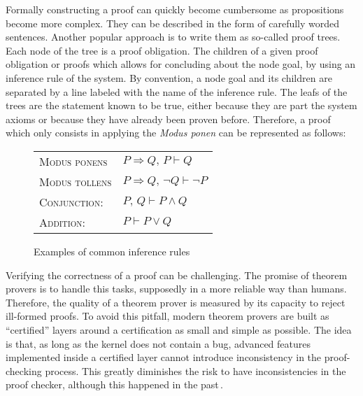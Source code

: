 \documentclass[oneside,a4paper]{memoir}
\theoremstyle{break}
\begin{document}
Formally constructing a proof can quickly become cumbersome as propositions
become more complex.
%
They can be described in the form of carefully worded sentences.
%
Another popular approach is to write them as so-called proof trees.
%
Each node of the tree is a proof obligation.
%
The children of a given proof obligation or proofs which allows for concluding
about the node goal, by using an inference rule of the system.
%
By convention, a node goal and its children are separated by a line labeled with
the name of the inference rule.
%
The leafs of the trees are the statement known to be true, either because they
are part the system axioms or because they have already been proven before.
%
Therefore, a proof which only consists in applying the \emph{Modus ponen} can be
represented as follows:
%
\begin{prooftree}
     
\end{prooftree}

\begin{figure}
  \begin{center}
    \begin{tabular}{ll}
      {\scshape Modus ponens} & \( P \Rightarrow Q\text{, }P \vdash Q \) \\
      {\scshape Modus tollens} &
                                 \( P \Rightarrow Q\text{, }\neg Q \vdash \neg P \) \\
      {\scshape Conjunction:} & \( P\text{, }Q \vdash P \wedge Q \) \\
      {\scshape Addition:} & \( P \vdash P \vee Q \)
    \end{tabular}
  \end{center}

  \caption{Examples of common inference rules}
  \label{fig:sota:inference}
\end{figure}

Verifying the correctness of a proof can be challenging.
%
The promise of theorem provers is to handle this tasks, supposedly in a more
reliable way than humans.
%
Therefore, the quality of a theorem prover is measured by its capacity to reject
ill-formed proofs.
%
To avoid this pitfall, modern theorem provers are built as ``certified'' layers
around a certification as small and simple as possible.
%
The idea is that, as long as the kernel does not contain a bug, advanced
features implemented inside a certified layer cannot introduce inconsistency in
the proof-checking process.
%
This greatly diminishes the risk to have inconsistencies in the proof checker,
although this happened in the
past\,\cite{claret2015falso,griffioen1998comparison}.
\end{document}
